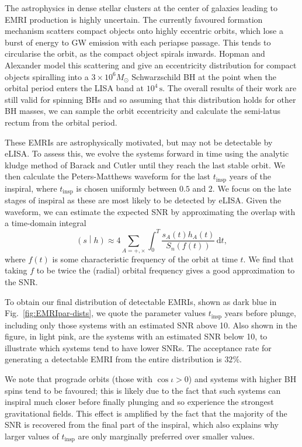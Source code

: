 \documentclass[aps,prd,amsfonts,amssymb,amsmath,nofootinbib,reprint,showpacs]{revtex4}
\newcommand{\figref}[1]{Fig.\ \ref{fig:#1}}
\newcommand{\dd}{\ensuremath{\mathrm{d}}}
\newcommand{\intd}[4]{\ensuremath{\int_{#1}^{#2}{#3}\,\dd{#4}}}
\newcommand{\overlap}[2]{\ensuremath{\left(#1\middle|#2\right)}}
\begin{document}
The astrophysics in dense stellar clusters at the center of galaxies leading to EMRI production is highly uncertain. The currently favoured formation mechanism scatters compact objects onto highly eccentric orbits, which lose a burst of energy to GW emission with each periapse passage. This tends to circularise the orbit, as the compact object spirals inwards. Hopman and Alexander \cite{Hopman2005} model this scattering and give an eccentricity distribution for compact objects spiralling into a $3 \times 10^6 M_\odot$ Schwarzschild BH at the point when the orbital period enters the LISA band at $10^4\,\mathrm{s}$. The overall results of their work are still valid for spinning BHs and so assuming that this distribution holds for other BH masses, we can sample the orbit eccentricity and calculate the semi-latus rectum from the orbital period.

These EMRIs are astrophysically motivated, but may not be detectable by eLISA. To assess this, we evolve the systems forward in time using the analytic kludge method of Barack and Cutler \cite{Barack2004} until they reach the last stable orbit. We then calculate the Peters-Matthews waveform \cite{Peters1963} for the last $t_\mathrm{insp}$ years of the inspiral, where $t_\mathrm{insp}$ is chosen uniformly between $0.5$ and $2$. We focus on the late stages of inspiral as these are most likely to be detected by eLISA. Given the waveform, we can estimate the expected SNR by approximating the overlap with a time-domain integral
\begin{equation}
\overlap{s}{h} \approx 4 \sum_{A=+,\times}\intd{0}{T}{\frac{s_A(t)h_A(t)}{S_n(f(t))}}{t},
\end{equation}
where $f(t)$ is some characteristic frequency of the orbit at time $t$. We find that taking $f$ to be twice the (radial) orbital frequency gives a good approximation to the SNR.

To obtain our final distribution of detectable EMRIs, shown as dark blue in \figref{EMRIpar-dists}, we quote the parameter values $t_\mathrm{insp}$ years before plunge, including only those systems with an estimated SNR above 10. Also shown in the figure, in light pink, are the systems with an estimated SNR below 10, to illustrate which systems tend to have lower SNRs. The acceptance rate for generating a detectable EMRI from the entire distribution is $32\%$.

We note that prograde orbits (those with $\cos\iota > 0$) and systems with higher BH spins tend to be favoured; this is likely due to the fact that such systems can inspiral much closer before finally plunging and so experience the strongest gravitational fields. This effect is amplified by the fact that the majority of the SNR is recovered from the final part of the inspiral, which also explains why larger values of $t_\mathrm{insp}$ are only marginally preferred over smaller values.
\end{document}

